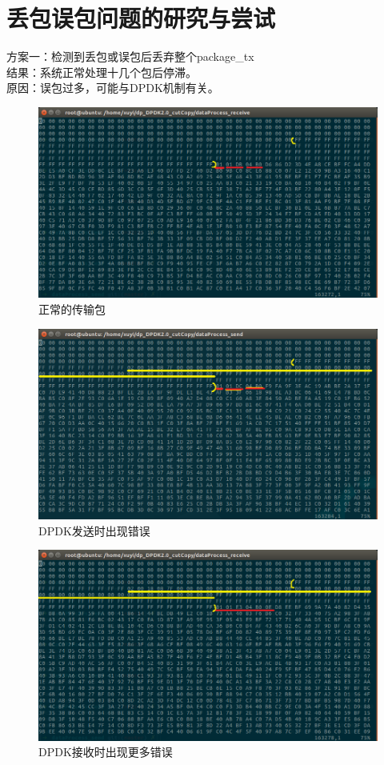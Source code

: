 \documentclass{article}
\begin{document}
\section{丢包误包问题的研究与尝试}
方案一：检测到丢包或误包后丢弃整个package\_tx \\
结果：系统正常处理十几个包后停滞。\\
原因：误包过多，可能与DPDK机制有关。\\
\begin{figure}[H]
	\centering
	\includegraphics[width = .8\textwidth]{data_right.png}
	\caption{正常的传输包}
\end{figure}
\begin{figure}[H]
	\centering
	\includegraphics[width = .8\textwidth]{data_send.png}
	\caption{DPDK发送时出现错误}
\end{figure}
\begin{figure}[H]
	\centering
	\includegraphics[width = .8\textwidth]{data_receive.png}
	\caption{DPDK接收时出现更多错误}
\end{figure}
\end{document}
